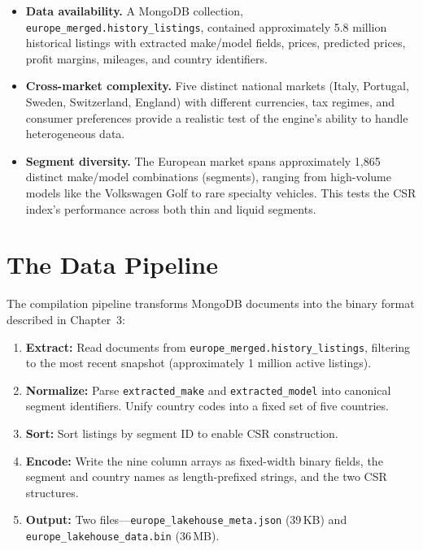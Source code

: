 \documentclass[11pt,a4paper,twoside]{book}
\begin{document}
\begin{itemize}[leftmargin=*]
    \item \textbf{Data availability.} A MongoDB collection,
          \texttt{europe\_merged.history\_listings}, contained approximately 5.8 million
          historical listings with extracted make/model fields, prices, predicted prices,
          profit margins, mileages, and country identifiers.
    \item \textbf{Cross-market complexity.} Five distinct national markets (Italy, Portugal,
          Sweden, Switzerland, England) with different currencies, tax regimes, and consumer
          preferences provide a realistic test of the engine's ability to handle heterogeneous
          data.
    \item \textbf{Segment diversity.} The European market spans approximately 1,865 distinct
          make/model combinations (segments), ranging from high-volume models like the
          Volkswagen Golf to rare specialty vehicles. This tests the CSR index's performance
          across both thin and liquid segments.
\end{itemize}

\section{The Data Pipeline}

The compilation pipeline transforms MongoDB documents into the binary format described in
Chapter~3:

\begin{enumerate}[leftmargin=*]
    \item \textbf{Extract:} Read documents from
          \texttt{europe\_merged.history\_listings}, filtering to the most recent snapshot
          (approximately 1 million active listings).
    \item \textbf{Normalize:} Parse \texttt{extracted\_make} and \texttt{extracted\_model}
          into canonical segment identifiers. Unify country codes into a fixed set of five
          countries.
    \item \textbf{Sort:} Sort listings by segment ID to enable CSR construction.
    \item \textbf{Encode:} Write the nine column arrays as fixed-width binary fields, the
          segment and country names as length-prefixed strings, and the two CSR structures.
    \item \textbf{Output:} Two files---\texttt{europe\_lakehouse\_meta.json} (39\,KB) and
          \texttt{europe\_lakehouse\_data.bin} (36\,MB).
\end{enumerate}
\end{document}
